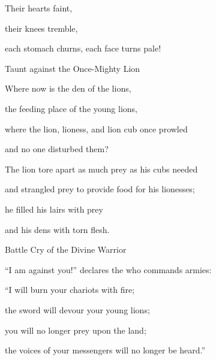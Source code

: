 {\par }{\Q Their hearts
faint,
\par }{\Q their knees
tremble,
\par }{\Q each stomach
churns,
each
face
turns
pale!
\par }{\SH Taunt against the Once-Mighty Lion
\par }{\Q {}Where
now is the den
of the lions,
\par }{\Q the feeding place
of the young lions,
\par }{\Q where
the lion,
lioness,
and lion
cub
once prowled

\par }{\Q and no
one disturbed them?
\par }{\Q {}The lion
tore apart
as much prey as his cubs
needed
\par }{\Q and strangled
prey to provide food for his lionesses;
\par }{\Q he filled
his lairs
with prey
\par }{\Q and his dens
with torn flesh.
\par }{\SH Battle Cry of the Divine Warrior
\par }{\Q {}“I am
against
you!” declares
the {}
who commands armies:

\par }{\Q “I will burn
your chariots
with fire;
\par }{\Q the sword
will devour
your young lions;
\par }{\Q you will no longer
prey
upon the land;
\par }{\Q the voices
of your messengers
will no
longer
be heard.”

\par }
